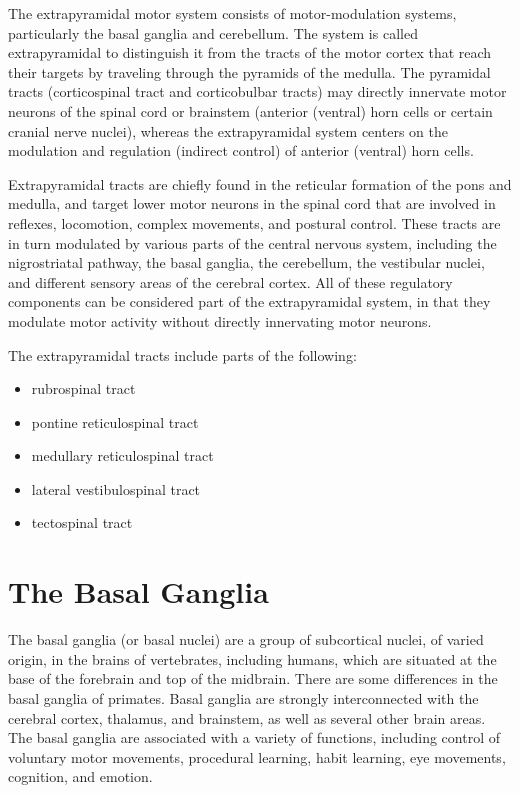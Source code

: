 \documentclass[]{book}
\providecommand{\tightlist}{%
  \setlength{\itemsep}{0pt}\setlength{\parskip}{0pt}}
\begin{document}
The extrapyramidal motor system consists of motor-modulation systems, particularly the basal ganglia and cerebellum. The system is called extrapyramidal to distinguish it from the tracts of the motor cortex that reach their targets by traveling through the pyramids of the medulla. The pyramidal tracts (corticospinal tract and corticobulbar tracts) may directly innervate motor neurons of the spinal cord or brainstem (anterior (ventral) horn cells or certain cranial nerve nuclei), whereas the extrapyramidal system centers on the modulation and regulation (indirect control) of anterior (ventral) horn cells.

Extrapyramidal tracts are chiefly found in the reticular formation of the pons and medulla, and target lower motor neurons in the spinal cord that are involved in reflexes, locomotion, complex movements, and postural control. These tracts are in turn modulated by various parts of the central nervous system, including the nigrostriatal pathway, the basal ganglia, the cerebellum, the vestibular nuclei, and different sensory areas of the cerebral cortex. All of these regulatory components can be considered part of the extrapyramidal system, in that they modulate motor activity without directly innervating motor neurons.

The extrapyramidal tracts include parts of the following:

\begin{itemize}
\tightlist
\item
  rubrospinal tract
\item
  pontine reticulospinal tract
\item
  medullary reticulospinal tract
\item
  lateral vestibulospinal tract
\item
  tectospinal tract
\end{itemize}

\hypertarget{the-basal-ganglia-1}{%
\section{The Basal Ganglia}\label{the-basal-ganglia-1}}

The basal ganglia (or basal nuclei) are a group of subcortical nuclei, of varied origin, in the brains of vertebrates, including humans, which are situated at the base of the forebrain and top of the midbrain. There are some differences in the basal ganglia of primates. Basal ganglia are strongly interconnected with the cerebral cortex, thalamus, and brainstem, as well as several other brain areas. The basal ganglia are associated with a variety of functions, including control of voluntary motor movements, procedural learning, habit learning, eye movements, cognition, and emotion.
\end{document}
